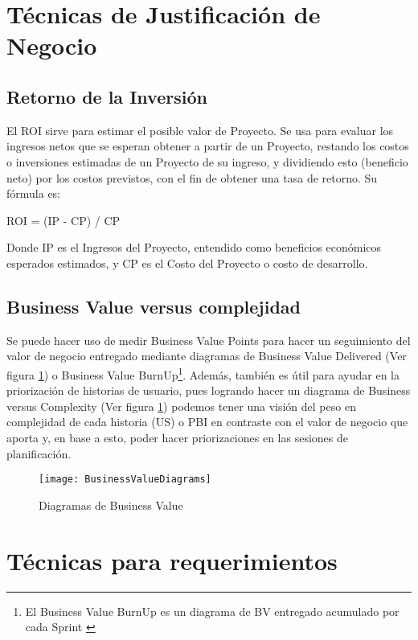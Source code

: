 \newpage
\section{Técnicas de Justificación de Negocio}

\subsection{Retorno de la Inversión}

El ROI sirve para estimar el posible valor de Proyecto. Se usa para evaluar los ingresos netos que se esperan obtener a partir de un Proyecto, restando los costos o inversiones estimadas de un Proyecto de su ingreso, y dividiendo esto (beneficio neto) por los costos previstos, con el fin de obtener una tasa de retorno. Su fórmula es:

ROI = (IP - CP) / CP

Donde IP es el Ingresos del Proyecto, entendido como beneficios económicos esperados estimados, y CP es el Costo del Proyecto o costo de desarrollo.

\subsection{Business Value versus complejidad}

Se puede hacer uso de medir Business Value Points para hacer un seguimiento del valor de negocio entregado mediante diagramas de Business Value Delivered (Ver figura \ref{fig:BusinessValueDiagrams}) o Business Value BurnUp\footnote{El Business Value BurnUp es un diagrama de BV entregado acumulado por cada Sprint \cite{Scrum-Alliance-2005}}. Además, también es útil para ayudar en la priorización de historias de usuario, pues logrando hacer un diagrama de Business versus Complexity (Ver figura \ref{fig:BusinessValueDiagrams}) podemos tener una visión del peso en complejidad de cada historia (US) o PBI en contraste con el valor de negocio que aporta y, en base a esto, poder hacer priorizaciones en las sesiones de planificación.

\begin{figure}[h]
  \centering
  \texttt{[image: BusinessValueDiagrams]}
  \caption{Diagramas de Business Value}
  \centering
  \label{fig:BusinessValueDiagrams} %
\end{figure}

\newpage
\section{Técnicas para requerimientos}

